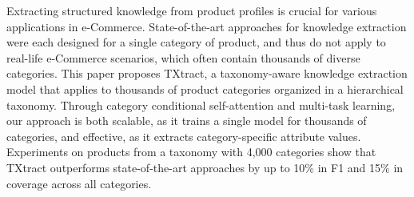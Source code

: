 Extracting structured knowledge from product profiles is crucial for various applications in e-Commerce. State-of-the-art approaches for knowledge extraction were each designed for a single category of product, and thus do not apply to real-life e-Commerce scenarios, which often contain thousands of diverse categories. This paper proposes TXtract, a taxonomy-aware knowledge extraction model that applies to thousands of product categories organized in a hierarchical taxonomy. Through category conditional self-attention and multi-task learning, our approach is both scalable, as it trains a single model for thousands of categories, and effective, as it extracts category-specific attribute values. Experiments on products from a taxonomy with 4,000 categories show that TXtract outperforms state-of-the-art approaches by up to 10\% in F1 and 15\% in coverage across all categories.
